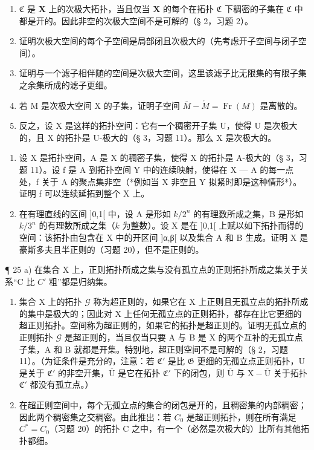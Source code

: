 \begin{enumerate}
\def\labelenumi{\alph{enumi})}
\setcounter{enumi}{1}
\item
  \(\mathfrak{C}\) 是 \(\mathbf{X}\) 上的次极大拓扑，当且仅当 \(\mathbf{X}\) 的每个在拓扑 \(\mathfrak{C}\) 下稠密的子集在 \(\mathfrak{C}\) 中都是开的。因此非空的次极大空间不是可解的（§ 2，习题 2）。
\item
  证明次极大空间的每个子空间是局部闭且次极大的（先考虑开子空间与闭子空间）。
\item
  证明与一个滤子相伴随的空间是次极大空间，这里该滤子比无限集的有限子集之余集所成的滤子更细。
\item
  若 M 是次极大空间 X 的子集，证明子空间 \(\overline{M} - \mathring{M} = \operatorname{Fr}(M)\) 是离散的。
\item
  反之，设 X 是这样的拓扑空间：它有一个稠密开子集 U，使得 U 是次极大的，且 X 的拓扑是 U-极大的（§ 3，习题 11）。那么 X 是次极大的。
\end{enumerate}

\begin{enumerate}
\def\labelenumi{\arabic{enumi})}
\setcounter{enumi}{22}
\item
  设 X 是拓扑空间，A 是 X 的稠密子集，使得 X 的拓扑是 A-极大的（§ 3，习题 11）。设 f 是 A 到拓扑空间 Y 中的连续映射，使得在 X --- A 的每一点处，f 关于 A 的聚点集非空（*例如当 X 非空且 Y 拟紧时即是这种情形*）。证明 f 可以连续延拓到整个 X 上。
\item
  在有理直线的区间 {]}0,1{[} 中，设 A 是形如 \(k/2^n\) 的有理数所成之集，B 是形如 \(k/3^n\) 的有理数所成之集（\(k\) 为整数）。设 X 是在 {]}0,1{[} 上赋以如下拓扑而得的空间：该拓扑由包含在 X 中的开区间 {]}α,β{[} 以及集合 A 和 B 生成。证明 X 是豪斯多夫且半正则的（习题 20），但不是正则的。
\end{enumerate}

¶ 25 a) 在集合 X 上，正则拓扑所成之集与没有孤立点的正则拓扑所成之集关于关系“C 比 \(C'\) 粗”都是归纳集。

\begin{enumerate}
\def\labelenumi{\alph{enumi})}
\setcounter{enumi}{1}
\item
  集合 X 上的拓扑 \(\mathcal{G}\) 称为超正则的，如果它在 X 上正则且无孤立点的拓扑所成的集中是极大的；因此对 X 上任何无孤立点的正则拓扑，都存在比它更细的超正则拓扑。空间称为超正则的，如果它的拓扑是超正则的。证明无孤立点的正则拓扑 \(\mathcal{G}\) 是超正则的，当且仅当只要 A 与 B 是 X 的两个互补的无孤立点子集，A 和 B 就都是开集。特别地，超正则空间不是可解的（§ 2，习题 11）。（为证条件是充分的，注意：若 \(\mathfrak{C}'\) 是比 \(\mathfrak{G}\) 更细的无孤立点正则拓扑，U 是关于 \(\mathfrak{C}'\) 的非空开集，\(\overline{\mathrm{U}}\) 是它在拓扑 \(\mathfrak{C}'\) 下的闭包，则 \(\overline{\mathrm{U}}\) 与 \(\mathrm{X} - \overline{\mathrm{U}}\) 关于拓扑 \(\mathfrak{C}'\) 都没有孤立点。）
\item
  在超正则空间中，每个无孤立点的集合的闭包是开的，且稠密集的内部稠密；因此两个稠密集之交稠密。由此推出：若 \(C_{0}\) 是超正则拓扑，则在所有满足 \(C^{*} = C_{0}\)（习题 20）的拓扑 C 之中，有一个（必然是次极大的）比所有其他拓扑都细。
\end{enumerate}

